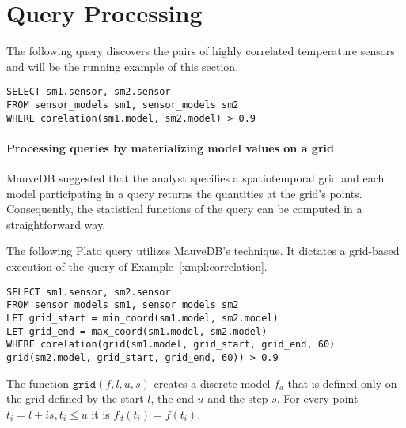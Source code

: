 \section{Query Processing}
\label{sec:query-processing}

\begin{example}
\label{xmpl:correlation}
The following query discovers the pairs of highly correlated temperature sensors and will be the running example of this section.
\begin{tabbing}
\scriptsize
\texttt{SELECT sm1.sensor, sm2.sensor}\\
\texttt{FROM sensor\_models sm1, sensor\_models sm2}\\
\texttt{WHERE corelation(sm1.model, sm2.model) > 0.9}
\end{tabbing}

\end{example}

\paragraph{Processing queries by materializing model values on a grid}
MauveDB suggested that the analyst specifies a spatiotemporal grid and each model participating in a query returns the quantities at the grid's points. Consequently, the statistical functions of the query can be computed in a straightforward way. 

\begin{example}
The following Plato query utilizes MauveDB's technique. It dictates a grid-based execution of the query of Example~\ref{xmpl:correlation}.
\begin{tabbing}
\texttt{SELECT sm1.sensor, sm2.sensor}\\
\texttt{FROM sensor\_models sm1, sensor\_models sm2}\\
\texttt{LET grid\_start = min\_coord(sm1.model, sm2.model)}\\
\texttt{LET grid\_end = max\_coord(sm1.model, sm2.model)}\\
\texttt{WHERE corelation(}\=\texttt{grid(sm1.model, grid\_start, grid\_end, 60)}\\ \>\texttt{grid(sm2.model, grid\_start, grid\_end, 60)) > 0.9}
\end{tabbing}
\noindent The function $\texttt{grid}(f, l, u, s)$ creates a discrete model $f_d$ that is defined only on the grid defined by the start $l$, the end $u$ and the step $s$.  For every point $t_i = l + is, t_i \leq u$ it is $f_d(t_i) = f(t_i)$.
\end{example}

